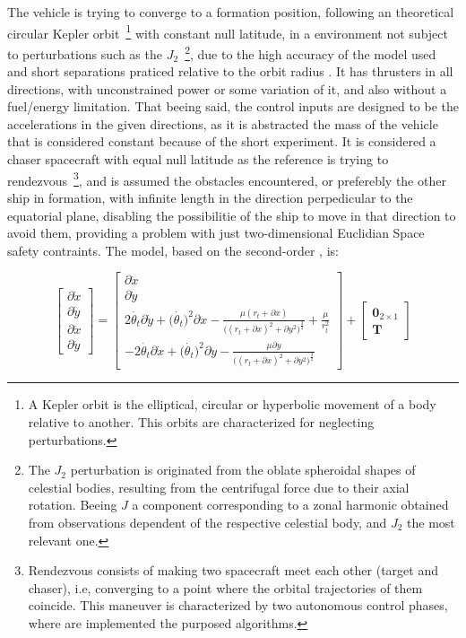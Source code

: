 The vehicle is trying to converge to a formation position, following an theoretical circular Kepler orbit~\footnote{A Kepler orbit  is the elliptical, circular or hyperbolic movement of a body relative to another. This orbits are characterized for neglecting perturbations.} with constant null latitude, in a environment not subject to perturbations such as the \(J_2\)~\footnote{ The \(J_2\) perturbation \cite{curtis2019orbital} is originated from  the oblate spheroidal shapes of celestial bodies, resulting from the centrifugal force due to their axial rotation. Beeing \(J\) a component corresponding to a zonal harmonic obtained from observations dependent of the respective celestial body, and \(J_2\) the most relevant one. }, due to the high accuracy of the model used and short separations praticed relative to the orbit radius \cite{kaczmarek2023autonomous}. It has thrusters in all directions, with unconstrained power or some variation of it, and also without a fuel/energy limitation. That beeing said, the control inputs are designed to be the accelerations in the given directions, as it is abstracted the mass of the vehicle that is considered constant because of the short experiment. It is considered a chaser spacecraft with equal null latitude as the reference \txtref is trying to rendezvous~\footnote{ Rendezvous \cite{luo2014survey} consists of making two spacecraft meet each other (target and chaser), i.e, converging to a point where the orbital trajectories of them coincide. This maneuver is characterized by two autonomous control phases, where are implemented the purposed algorithms.}, and is assumed the obstacles encountered, or preferebly the other ship in formation, with infinite length in the direction perpedicular to the equatorial plane, disabling the possibilitie of the ship to move in that direction to avoid them, providing a problem with just two-dimensional Euclidian Space safety contraints.  The model, based on the second-order  \cite{sullivan2017comprehensive}, is:

\begin{equation}
  \begin{bmatrix} \partial \dot{x} \\ \partial \dot{y} \\  \partial\ddot{ x } \\ \partial\ddot{ y} \end{bmatrix} = \begin{bmatrix}
  \partial\dot{ x } \\ \partial\dot{ y } \\ 2\dot{\theta_t}\partial\dot{y} + \bigl(\dot{\theta_t}\bigr)^2 \partial x - \frac{\mu(r_t + \partial x)}{\bigl((r_t + \partial x)^2 + \partial y^2\bigr)^{\frac{3}{2}}} + \frac{\mu}{r_t^2}  \\ -2\dot{\theta_t}\partial\dot{x} + \bigl(\dot{\theta_t}\bigr)^2 \partial y - \frac{\mu \partial y}{\bigl((r_t + \partial x)^2 + \partial y^2\bigr)^{\frac{3}{2}}} 
  \end{bmatrix} + \begin{bmatrix}
  \mathbf{0}_{2 \times 1} \\ \mathbf{T}
  \end{bmatrix}
  \label{eq:orbital_dynamics}
\end{equation}

